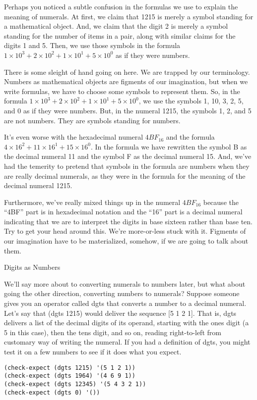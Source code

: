 \begin{aside}
Perhaps you noticed a subtle confusion in the formulas we use
to explain the meaning of numerals. At first, we claim that
1215 is merely a symbol standing for a mathematical object.
And, we claim that the digit 2 is merely a symbol standing
for the number of items in a pair, along with similar
claims for the digits 1 and 5. Then, we use those symbols
in the formula $1 \times 10^3 + 2 \times 10^2 + 1 \times 10^1 + 5 \times 10^0$
as if they were numbers.

There is some sleight of hand going on here.
We are trapped by our terminology.
Numbers as mathematical objects are figments of our imagination,
but when we write formulas, we have to choose some symbols to
represent them.
So, in the formula $1 \times 10^3 + 2 \times 10^2 + 1 \times 10^1 + 5 \times 10^0$,
we use the symbols 1, 10, 3, 2, 5, and 0 as if they were numbers.
But, in the numeral 1215, the symbols 1, 2, and 5 are not numbers.
They are symbols standing for numbers.

It's even worse with the hexadecimal numeral $4BF_{16}$
and the formula $4 \times 16^2 + 11 \times 16^1 + 15 \times 16^0$.
In the formula we have rewritten the symbol B as the decimal numeral 11
and the symbol F as the decimal numeral 15.
And, we've had the temerity to pretend that symbols
in the formula are numbers when they are really decimal numerals,
as they were in the formula for the meaning of the decimal numeral 1215.

Furthermore, we've really mixed things up in the numeral
$4BF_{16}$ because the ``4BF'' part is in hexadecimal notation
and the ``16'' part is a decimal numeral indicating that we are
to interpret the digits in base sixteen rather than base ten.
Try to get your head around this.
We're more-or-less stuck with it. Figments of our imagination have
to be materialized, somehow, if we are going to talk about them.
\caption{Digits as Numbers}
\label{aside-digits-as-numbers}
\end{aside}

We'll say more about to converting numerals to numbers later,
but what about going the other direction, converting
numbers to numerals?
Suppose someone gives you an operator called dgts that
converts a number to a decimal numeral.
Let's say that (dgts 1215) would deliver the sequence [5 1 2 1].
That is, dgts delivers a list of the decimal digits
of its operand,
starting with the ones digit (a 5 in this case),
then the tens digit, and so on, reading right-to-left from
customary way of writing the numeral.
If you had a definition of dgts,
you might test it on a few numbers to see if it does what you expect.
\begin{Verbatim}
(check-expect (dgts 1215) '(5 1 2 1))
(check-expect (dgts 1964) '(4 6 9 1))
(check-expect (dgts 12345) '(5 4 3 2 1))
(check-expect (dgts 0) '())
\end{Verbatim}

